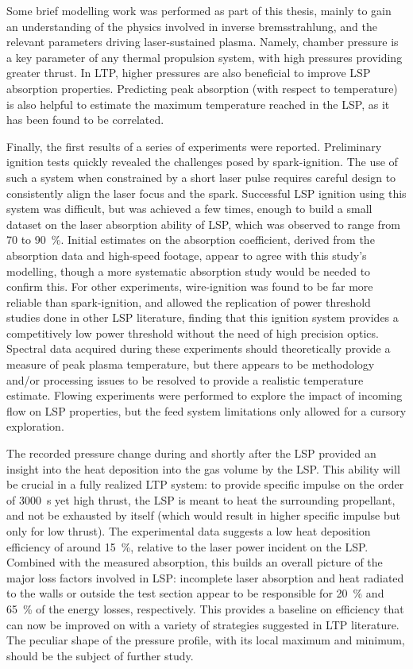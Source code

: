     Some brief modelling work was performed as part of this thesis, mainly to gain an understanding of the physics involved in inverse bremsstrahlung, and the relevant parameters driving laser-sustained plasma. Namely, chamber pressure is a key parameter of any thermal propulsion system, with high pressures providing greater thrust. In LTP, higher pressures are also beneficial to improve LSP absorption properties. Predicting peak absorption (with respect to temperature) is also helpful to estimate the maximum temperature reached in the LSP, as it has been found to be correlated.

    Finally, the first results of a series of experiments were reported. Preliminary ignition tests quickly revealed the challenges posed by spark-ignition. The use of such a system when constrained by a short laser pulse requires careful design to consistently align the laser focus and the spark. Successful LSP ignition using this system was difficult, but was achieved a few times, enough to build a small dataset on the laser absorption ability of LSP, which was observed to range from 70 to 90~\%. Initial estimates on the absorption coefficient, derived from the absorption data and high-speed footage, appear to agree with this study's modelling, though a more systematic absorption study would be needed to confirm this. For other experiments, wire-ignition was found to be far more reliable than spark-ignition, and allowed the replication of power threshold studies done in other LSP literature, finding that this ignition system provides a competitively low power threshold without the need of high precision optics. Spectral data acquired during these experiments should theoretically provide a measure of peak plasma temperature, but there appears to be methodology and/or processing issues to be resolved to provide a realistic temperature estimate. Flowing experiments were performed to explore the impact of incoming flow on LSP properties, but the feed system limitations only allowed for a cursory exploration.
    
    The recorded pressure change during and shortly after the LSP provided an insight into the heat deposition into the gas volume by the LSP. This ability will be crucial in a fully realized LTP system: to provide specific impulse on the order of \qty{3000}{s} yet high thrust, the LSP is meant to heat the surrounding propellant, and not be exhausted by itself (which would result in higher specific impulse but only for low thrust). The experimental data suggests a low heat deposition efficiency of around 15~\%, relative to the laser power incident on the LSP. Combined with the measured absorption, this builds an overall picture of the major loss factors involved in LSP: incomplete laser absorption and heat radiated to the walls or outside the test section appear to be responsible for 20~\% and 65~\% of the energy losses, respectively. This provides a baseline on efficiency that can now be improved on with a variety of strategies suggested in LTP literature. The peculiar shape of the pressure profile, with its local maximum and minimum, should be the subject of further study.

